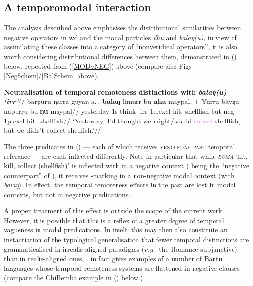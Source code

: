 \subsection{A temporomodal interaction}

The analysis described above emphasises the distributional similarities between negative operators in \gls{wd} and the modal particles \textit{dhu} and \textit{balaŋ(u)}, in view of assimilating these classes into a category of ``nonveridical operators'', it is also worth considering distributional differences between them, demonstrated in (\nextx) below, repeated from (\ref{MODvNEG}) above (compare also Figs \ref{NegSchem}/\ref{BalSchem} above).

\pex\begingl\glpreamble\textbf{ Neutralisation of temporal remoteness distinctions with \textit{balaŋ(u) `\gls{irr}'}}//
\gla barpuru ŋarra guyaŋ-a... \textbf{balaŋ} limurr bu-\textbf{nha} maypal. + Yurru bäyŋu napurru bu-\textbf{ŋu} maypal//
\glb yesterday 1s think-\I{} \gls{irr} 1d.\gls{excl} hit.\IV{} shellfish but \gls{neg} 1p.\gls{excl} hit-\II{} shellfish//
\glft`Yesterday, I'd \textcolor{forest}{thought} we might/would \textcolor{violet}{collect} shellfish, but we didn't \textcolor{ochre}{collect} shellfish.'\trailingcitation{[AW~20190429]}//\endgl
\xe


The three predicates in (\lastx) --- each of which receives \textsc{yesterday past} temporal reference --- are each inflected differently. Note in particular that while \textit{\textsc{buma}} `hit, kill, collect (shellfish)' is inflected with \II{}  in a negative context (\II{} being the ``negative counterpart'' of \I{}), it receives \IV{}-marking in a non-negative modal context (with \textit{balaŋ}). In effect, the temporal remoteness effects in the past are lost in modal contexts, but not in negative predications.

A proper treatment of this effect is outside the scope of the current work. However, it is possible that this is a reflex of a greater degree of temporal vagueness in modal predications. In itself, this may then also constitute an instantiation of the typological generalisation that fewer temporal distinctions are grammaticalised in irrealis-aligned paradigms (\textit{e.g.}, the Romance subjunctive) than in realis-aligned ones, \citep[see][156]{Miestamo2005,Horn2001}. \citet{ Givon1975} in fact gives examples of a number of Bantu languages whose temporal remoteness systems are flattened in negative clauses (compare the ChiBemba example in (\nextx) below.)

